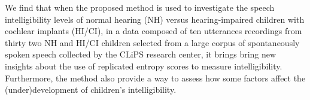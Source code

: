 We find that when the proposed method is used to investigate the speech intelligibility levels of normal hearing (NH) versus hearing-impaired children with cochlear implants (HI/CI), in a data composed of ten utterances recordings from thirty two NH and HI/CI children selected from a large corpus of spontaneously spoken speech collected by the CLiPS research center, it brings bring new insights about the use of replicated entropy scores to measure intelligibility. Furthermore, the method also provide a way to assess how some factors affect the (under)development of children's intelligibility.


\begin{comment}
	
	Fourth, we implement all of the above in a data set consisting of repeated entropy measures, with the purpose of determine which factors affect the \textit{speech intelligibility} levels of normal hearing (NH) versus hearing-impaired children with cochlear implants (HI/CI). The entropy measures were calculated using the transcriptions of one hundred language students from the University of Antwerp, where each student transcribed the stimuli to the Qualtrics environment \citep{Qualtrics_2005}. The stimuli consisted in ten utterances recordings for each of the thirty two NH and HI/CI children, selected from a large corpus of \textit{spontaneously spoken speech} collected by the Computational Linguistic and Psycholinguistics Research Centre (CLiPS).
	
	On the one hand, the method reveal that, not integrating the bounded nature of the data in the modeling procedure could lead us to wrongful statistical conclusions. More precisely, it could lead us to an overestimation of the parameter estimates' precision.
	
	Lastly, our hypothesis tests reveal that hearing impaired children with cochlear implants (HI/CI) and genetic etiology have similar levels of intelligibility as normal hearing kids (NH), when both groups have a `hearing ages' of five. However, the same cannot be said for children with other etiologies, like CMV infection or other causes, as they start a significantly lower level of intelligibility at same `ages'. Moreover, our tests found enough evidence to assert that NH children develop their intelligibility with each `hearing year' at a higher rate than HI/CI kids. This offer evidence contrary to what was previously found \citep{Boonen_et_al_2021}.
	
	Finally, we observe our results support the hypothesis that HI/CI children with severe hearing loss, as accounted by the pure tone average, develop their language at a slower rate than their NH counterparts.

\end{comment}
%
%
